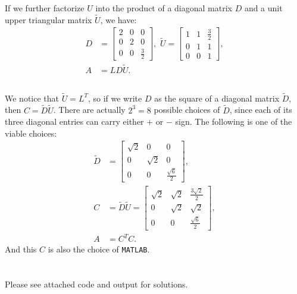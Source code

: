 \documentclass[11pt]{article}
\begin{document}
If we further factorize $U$ into the product of a diagonal matrix $D$ and a unit upper triangular matrix $\tilde U$, we have:
\begin{equation}\begin{split} 
D &= \begin{bmatrix} 2 & 0 & 0 \\ 0 & 2 & 0 \\ 0 & 0 & \frac32\end{bmatrix}, \,\, 
\tilde U = \begin{bmatrix} 1 & 1 & \frac32\\ 0 & 1 & 1 \\ 0 & 0 & 1\end{bmatrix},\\
A &= L D \tilde U.  
\end{split}\nonumber\end{equation} 
\subsection{}
We notice that $\tilde U = L^T$, so if we write $D$ as the square of a diagonal matrix $\tilde D$, then $C = \tilde D \tilde U$. There are actually $2^3=8$ possible choices of $\tilde D$, since each of its three diagonal entries can carry either $+$ or $-$ sign. The following is one of the viable choices:
\begin{equation}\begin{split}
\tilde D &= \begin{bmatrix} \sqrt{2} & 0 & 0 \\ 0 & \sqrt{2} & 0 \\ 0 & 0 & \frac{\sqrt{6}}2 \end{bmatrix},\\
C &= \tilde D \tilde U = \begin{bmatrix}\sqrt{2} & \sqrt{2} & \frac{3\sqrt{2}}2 \\ 0 & \sqrt{2} & \sqrt{2} \\ 0 & 0 & \frac{\sqrt{6}}2  \end{bmatrix},\\
A &= C^TC.
\end{split}\nonumber\end{equation} 
And this $C$ is also the choice of \texttt{MATLAB}.
\section{}
Please see attached code and output for solutions.
\end{document}
